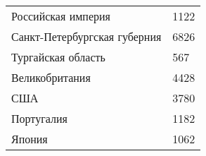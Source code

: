 \label{table:eco}
\centering
\begin{tabularx}{\tableecowidth}{Xl}
\hline
Российская империя           & 1122 \\
Санкт-Петербургская губерния & 6826 \\
Тургайская область           & 567  \\
Великобритания               & 4428 \\
США                          & 3780 \\
Португалия                   & 1182 \\
Япония                       & 1062 \\
\hline
\end{tabularx}